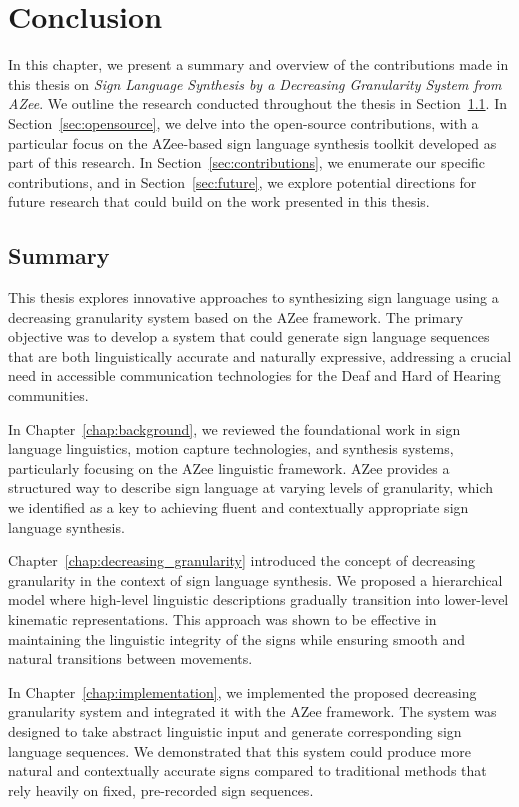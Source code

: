 \documentclass[../../main.tex]{subfiles}
\begin{document}
\chapter{Conclusion}
\label{ch:conclusion}

In this chapter, we present a summary and overview of the contributions made in this thesis on \textit{Sign Language Synthesis by a Decreasing Granularity System from AZee}. We outline the research conducted throughout the thesis in Section~\ref{sec:summary}. In Section~\ref{sec:opensource}, we delve into the open-source contributions, with a particular focus on the AZee-based sign language synthesis toolkit developed as part of this research. In Section~\ref{sec:contributions}, we enumerate our specific contributions, and in Section~\ref{sec:future}, we explore potential directions for future research that could build on the work presented in this thesis.

\section{Summary}
\label{sec:summary}

This thesis explores innovative approaches to synthesizing sign language using a decreasing granularity system based on the AZee framework. The primary objective was to develop a system that could generate sign language sequences that are both linguistically accurate and naturally expressive, addressing a crucial need in accessible communication technologies for the Deaf and Hard of Hearing communities.

In Chapter~\ref{chap:background}, we reviewed the foundational work in sign language linguistics, motion capture technologies, and synthesis systems, particularly focusing on the AZee linguistic framework. AZee provides a structured way to describe sign language at varying levels of granularity, which we identified as a key to achieving fluent and contextually appropriate sign language synthesis.

Chapter~\ref{chap:decreasing_granularity} introduced the concept of decreasing granularity in the context of sign language synthesis. We proposed a hierarchical model where high-level linguistic descriptions gradually transition into lower-level kinematic representations. This approach was shown to be effective in maintaining the linguistic integrity of the signs while ensuring smooth and natural transitions between movements.

In Chapter~\ref{chap:implementation}, we implemented the proposed decreasing granularity system and integrated it with the AZee framework. The system was designed to take abstract linguistic input and generate corresponding sign language sequences. We demonstrated that this system could produce more natural and contextually accurate signs compared to traditional methods that rely heavily on fixed, pre-recorded sign sequences.
\end{document}

